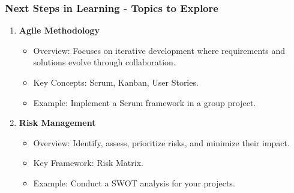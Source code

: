 \documentclass[aspectratio=169]{beamer}
\begin{document}
\begin{frame}[fragile]
    \frametitle{Next Steps in Learning - Topics to Explore}
    \begin{enumerate}
        \item \textbf{Agile Methodology}
            \begin{itemize}
                \item Overview: Focuses on iterative development where requirements and solutions evolve through collaboration.
                \item Key Concepts: Scrum, Kanban, User Stories.
                \item Example: Implement a Scrum framework in a group project.
            \end{itemize}
        \item \textbf{Risk Management}
            \begin{itemize}
                \item Overview: Identify, assess, prioritize risks, and minimize their impact.
                \item Key Framework: Risk Matrix.
                \item Example: Conduct a SWOT analysis for your projects.
            \end{itemize}
    \end{enumerate}
\end{frame}
\end{document}
